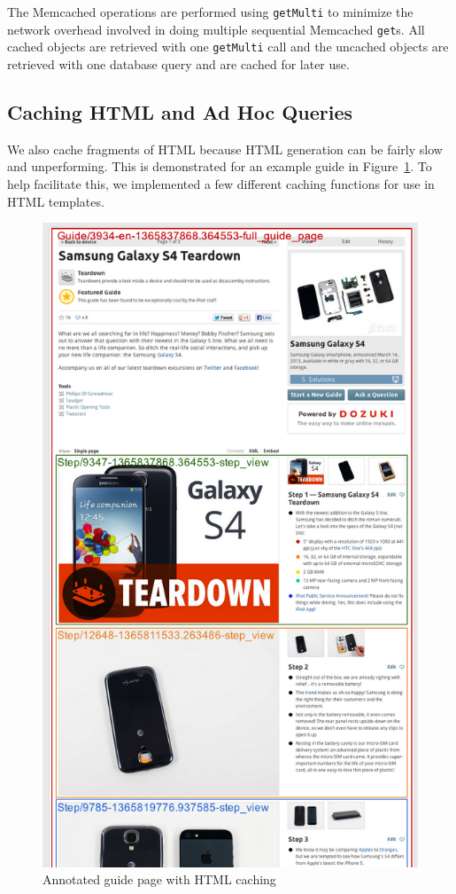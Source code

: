 \documentclass[12pt]{ucthesis}
\begin{document}
The \textsf{Memcached} operations are performed using {\tt getMulti} to minimize the network overhead involved in doing multiple sequential \textsf{Memcached} {\tt get}s.
All cached objects are retrieved with one {\tt getMulti} call and the uncached objects are retrieved with one database query and are cached for later use.

\subsection{Caching HTML and Ad Hoc Queries}
We also cache fragments of HTML because HTML generation can be fairly slow and unperforming.
This is demonstrated for an example guide in Figure~\ref{fig:annotatedCachedGuidePage}.
To help facilitate this, we implemented a few different caching functions for use in HTML templates.

\begin{figure}[hbtp]
\centering
\includegraphics[width=\textwidth,height=0.95\textheight]{assets/annotatedCachedGuidePage.png}
\caption{Annotated guide page with HTML caching}
\label{fig:annotatedCachedGuidePage}
\end{figure}
\end{document}
